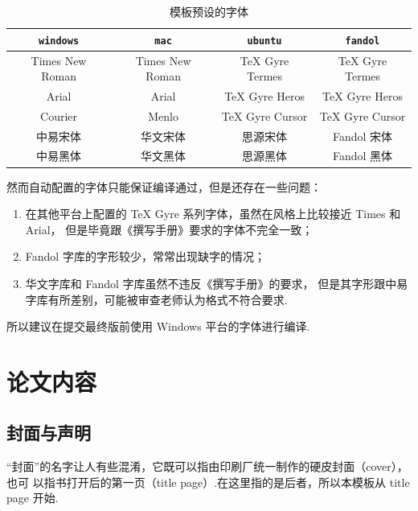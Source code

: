 \documentclass[a4paper]{ltxdoc}
\DeclareRobustCommand\opt{\texttt}
\begin{document}
\begin{table}[htb]
  \centering
  \caption{模板预设的字体}
  \label{tab:fontset}
  \begin{tabular}{cccc}
    \toprule
    \opt{windows} & \opt{mac}    & \opt{ubuntu} & \opt{fandol} \\
    \midrule
    Times New Roman  & Times New Roman & TeX Gyre Termes & TeX Gyre Termes \\
    Arial            & Arial           & TeX Gyre Heros  & TeX Gyre Heros  \\
    Courier          & Menlo           & TeX Gyre Cursor & TeX Gyre Cursor \\
    中易宋体         & 华文宋体        & 思源宋体        & Fandol 宋体     \\
    中易黑体         & 华文黑体        & 思源黑体        & Fandol 黑体     \\
    \bottomrule
  \end{tabular}
\end{table}

然而自动配置的字体只能保证编译通过，但是还存在一些问题：
\begin{enumerate}
  \item 在其他平台上配置的 TeX Gyre 系列字体，虽然在风格上比较接近 Times 和 Arial，
    但是毕竟跟《撰写手册》要求的字体不完全一致；
  \item Fandol 字库的字形较少，常常出现缺字的情况；
  \item 华文字库和 Fandol 字库虽然不违反《撰写手册》的要求，
    但是其字形跟中易字库有所差别，可能被审查老师认为格式不符合要求.
\end{enumerate}

所以建议在提交最终版前使用 Windows 平台的字体进行编译.



\section{论文内容}

\subsection{封面与声明}

“封面”的名字让人有些混淆，它既可以指由印刷厂统一制作的硬皮封面（cover），也可
以指书打开后的第一页（title page）.在这里指的是后者，所以本模板从 title page
开始.
\end{document}
